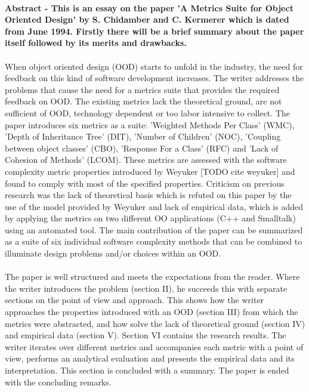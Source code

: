 \paragraph{}
\textbf{
Abstract - This is an essay on the paper 'A Metrics Suite for Object Oriented Design' by S. Chidamber and C.
Kermerer which is dated from June 1994. Firstly there will be a brief summary about the paper itself followed by
its merits and drawbacks.
}

\paragraph{}
When object oriented design (OOD) starts to unfold in the industry, the need for feedback on this kind of software
development increases. The writer addresses the problems that cause the need for a metrics suite that provides the
required feedback on OOD. The existing metrics lack the theoretical ground, are not sufficient of OOD,
technology dependent or too labor intensive to collect.
The paper introduces six metrics as a suite: 'Weighted Methods Per Class' (WMC), 'Depth of Inheritance Tree' (DIT),
'Number of Children' (NOC), 'Coupling between object classes' (CBO), 'Response For a Class' (RFC) and 'Lack of
Cohesion of Methods' (LCOM). These metrics are assessed with the software complexity metric properties introduced by
Weyuker [TODO cite weyuker] and found to comply with most of the specified properties.
Criticism on previous research was the lack of theoretical basis which is refuted on this paper by the use of the
model provided by Weyuker and lack of empirical data, which is added by applying the metrics on two different OO
applications (C++ and Smalltalk) using an automated tool. The main contribution of the paper can be summarized as a
suite of six individual software complexity methods that can be combined to illuminate design problems and/or choices
within an OOD.

\paragraph{}
The paper is well structured and meets the expectations from the reader. Where the writer introduces the problem
(section II), he succeeds this with separate sections on the point of view and approach. This shows how the writer
approaches the properties introduced with an OOD (section III) from which the metrics were abstracted, and how solve the
lack of theoretical ground (section IV) and empirical data (section V). Section VI contains the research results. The
writer iterates over different metrics and accompanies each metric with a point of view, performs an analytical
evaluation and presents the empirical data and its interpretation. This section is concluded with a summary.
The paper is ended with the concluding remarks.

